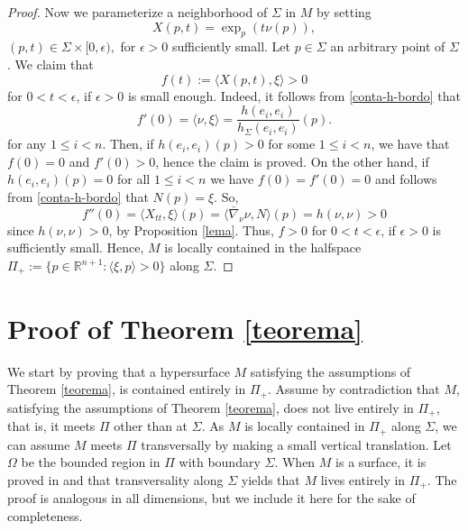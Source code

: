 \documentclass[11pt]{amsart}
\theoremstyle{plain}
\numberwithin{equation}{section}
\numberwithin{theorem}{section}
\begin{document}
\begin{proof}
Now we parameterize a neighborhood of $\Sigma$ in $M$ by setting  
\[
X(p,t)=\exp_{p}\left(t\nu(p)\right),
\]
$(p,t)\in \Sigma\times [0,\epsilon),$ for $\epsilon>0$ sufficiently small. Let $p\in \Sigma$ an arbitrary point of $\Sigma$. We claim that
 \[
 f(t):=\langle X(p,t), \xi \rangle >0
 \]
  for  $0<t<\epsilon$, if $\epsilon>0$ is small enough. Indeed, it follows from \eqref{conta-h-bordo} that 
  \[
  f'(0)=\langle  \nu, \xi\rangle= \frac{h(e_i, e_i)}{h_\Sigma(e_i, e_i)}(p).
  \] 
  for any $1\leq i<n$. Then, if $h(e_i,e_i)(p)>0$ for some $1\leq i<n$, we have that $f(0)=0$ and $f'(0)>0$, hence the claim is proved. On the other hand, if $h(e_i,e_i)(p)= 0$ for all $1\leq i<n$ we have $f(0)=f'(0)=0$ and follows from \eqref{conta-h-bordo} that $N(p)=\xi$. So,
  \[
  f''(0)= \langle X_{tt}, \xi \rangle (p)= \langle \bar\nabla_\nu \nu, N \rangle (p)=  h(\nu, \nu) >0
  \]
since $h(\nu, \nu) >0$,  by Proposition \ref{lema}. Thus, $f>0$ for  $0<t<\epsilon$, if $\epsilon>0$ is sufficiently small.
Hence, $M$ is locally contained in the halfspace $\Pi_+:=\{ p\in\mathbb{R}^{n+1} : \langle \xi, p\rangle >0\}$ along $\Sigma$.
\end{proof}




\section{Proof of Theorem \ref*{teorema}}

We start by proving that  a hypersurface $M$ satisfying the assumptions of Theorem \ref{teorema},  is contained entirely  in $\Pi_+$.
Assume by contradiction   that $M$, satisfying the assumptions of Theorem \ref*{teorema}, does not live entirely  in $\Pi_+$, that is, it  meets $\Pi$ other than at $\Sigma$. As $M$ is locally contained in $\Pi_+$ along $\Sigma$, we can assume $M$ meets $\Pi$ transversally by making a small vertical translation. Let $\Omega$ be the bounded region in $\Pi$ with boundary $\Sigma$.  When $M$ is a surface, it is proved in   \cite{BE91} and \cite{BEMR91} that transversality along $\Sigma$ yields that $M$ lives entirely in 
$\Pi_+$. The proof is analogous in all dimensions, but we include it here for the sake of completeness.
\end{document}
